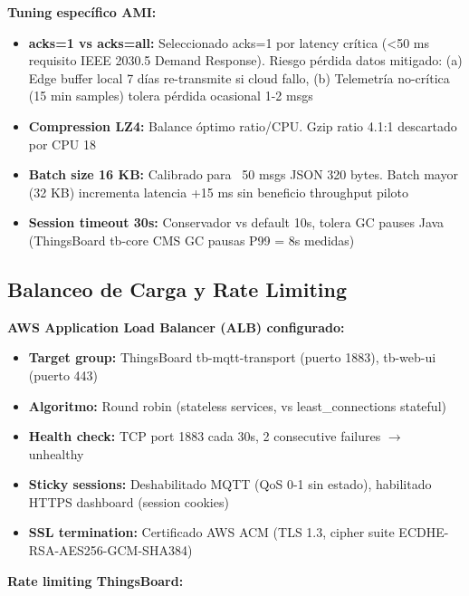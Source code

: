 \textbf{Tuning específico AMI:}

\begin{itemize}
    \item \textbf{acks=1 vs acks=all:} Seleccionado acks=1 por latency crítica (<50 ms requisito IEEE 2030.5 Demand Response). Riesgo pérdida datos mitigado: (a) Edge buffer local 7 días re-transmite si cloud fallo, (b) Telemetría no-crítica (15 min samples) tolera pérdida ocasional 1-2 msgs
    \item \textbf{Compression LZ4:} Balance óptimo ratio/CPU. Gzip ratio 4.1:1 descartado por CPU 18%
    \item \textbf{Batch size 16 KB:} Calibrado para ~50 msgs JSON 320 bytes. Batch mayor (32 KB) incrementa latencia +15 ms sin beneficio throughput piloto
    \item \textbf{Session timeout 30s:} Conservador vs default 10s, tolera GC pauses Java (ThingsBoard tb-core CMS GC pausas P99 = 8s medidas)
\end{itemize}

\subsection{Balanceo de Carga y Rate Limiting}
\label{sec:server-balanceo}

\textbf{AWS Application Load Balancer (ALB) configurado:}

\begin{itemize}
    \item \textbf{Target group:} ThingsBoard tb-mqtt-transport (puerto 1883), tb-web-ui (puerto 443)
    \item \textbf{Algoritmo:} Round robin (stateless services, vs least\_connections stateful)
    \item \textbf{Health check:} TCP port 1883 cada 30s, 2 consecutive failures $\rightarrow$ unhealthy
    \item \textbf{Sticky sessions:} Deshabilitado MQTT (QoS 0-1 sin estado), habilitado HTTPS dashboard (session cookies)
    \item \textbf{SSL termination:} Certificado AWS ACM (TLS 1.3, cipher suite ECDHE-RSA-AES256-GCM-SHA384)
\end{itemize}

\textbf{Rate limiting ThingsBoard:}

